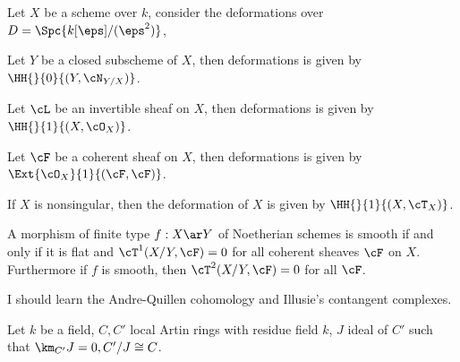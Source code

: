 \documentclass[a4paper, twoside]{article}
\begin{document}
\begin{thm}
	Let $X$ be a scheme over $k$, consider the deformations over $D=\Spc{k[\eps]/(\eps^{2})}$,
	\begin{enr}[label=(\Alph*)]
		\item {\cite[Theorem~2.4]{Hartshorne2010}} Let $Y$ be a closed subscheme of $X$, then deformations is given by $\HH{}{0}{(Y,\cN_{Y/X})}$.
		\item {\cite[Proposition~2.6]{Hartshorne2010}} Let $\cL$ be an invertible sheaf on $X$, then deformations is given by $\HH{}{1}{(X,\cO_{X})}$.
		\item {\cite[Theorem~2.7]{Hartshorne2010}} Let $\cF$ be a coherent sheaf on $X$, then deformations is given by $\Ext{\cO_{X}}{1}{(\cF,\cF)}$.
		\item {\cite[Theorem~5.3]{Hartshorne2010}} If $X$ is nonsingular, then the deformation of $X$ is given by $\HH{}{1}{(X,\cT_{X})}$.
	\end{enr}
\end{thm}

\begin{thm}
	A morphism of finite type $f:X\ar Y$ of Noetherian schemes is smooth if and only if it is flat and $\cT^{1}(X/Y,\cF)=0$ for all coherent sheaves $\cF$ on $X$. Furthermore if $f$ is smooth, then $\cT^{2}(X/Y,\cF)=0$ for all $\cF$.
\end{thm}

\begin{rmk}
	I should learn the Andre-Quillen cohomology and Illusie's contangent complexes.
\end{rmk}

\begin{stp}
	Let $k$ be a field, $C,C'$ local Artin rings with residue field $k$, $J$ ideal of $C'$ such that $\km_{C'}J=0,C'/J\cong C$.
\end{stp}
\end{document}
